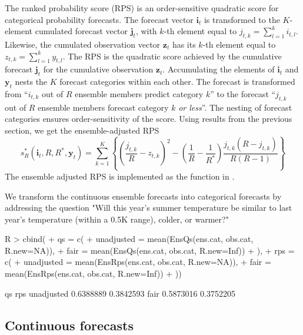 \documentclass[article]{jss}
\begin{document}
The ranked probability score (RPS) is an order-sensitive quadratic score for categorical probability forecasts.
The forecast vector $\mathbf{i}_t$ is transformed to the $K$-element cumulated forecast vector $\mathbf{j}_t$, with $k$-th element equal to $j_{t,k} = \sum_{l=1}^k i_{t,l}$.
Likewise, the cumulated observation vector $\mathbf{z}_t$ has its $k$-th element equal to $z_{t,k} = \sum_{l=1}^k y_{t,l}$.
The RPS is the quadratic score achieved by the cumulative forecast $\mathbf{j}_t$ for the cumulative observation $\mathbf{z}_t$.
Accumulating the elements of $\mathbf{i}_t$ and $\mathbf{y}_t$ nests the $K$ forecast categories within each other. 
The forecast is transformed from ``$i_{t,k}$ out of $R$ ensemble members predict category $k$'' to the forecast ``$j_{t,k}$ out of $R$ ensemble members forecast category $k$ \emph{or less}''.
The nesting of forecast categories ensures order-sensitivity of the score.
Using results from the previous section, we get the ensemble-adjusted RPS
%
\begin{equation}
s_{R}^*(\mathbf{i}_t, R, R^*, \mathbf{y}_t) = \sum_{k=1}^K \left\{ \left(\frac{j_{t,k}}{R} - z_{t,k}\right)^2 - \left(\frac{1}{R} - \frac{1}{R^*}\right) \frac{j_{t,k}(R-j_{t,k})}{R(R-1)}\right\}
\end{equation}
%
The ensemble adjusted RPS is implemented as the function  in .



We transform the continuous ensemble forecasts into categorical forecasts by addressing the question "Will this year's summer temperature be similar to last year's temperature (within a 0.5K range), colder, or warmer?"

\begin{Schunk}
\begin{Sinput}
R > cbind(
+ qs = c(
+   unadjusted = mean(EnsQs(ens.cat, obs.cat, R.new=NA)), 
+   fair       = mean(EnsQs(ens.cat, obs.cat, R.new=Inf))
+ ),
+ rps = c(
+   unadjusted = mean(EnsRps(ens.cat, obs.cat, R.new=NA)), 
+   fair       = mean(EnsRps(ens.cat, obs.cat, R.new=Inf))
+ ))
\end{Sinput}
\begin{Soutput}
                  qs       rps
unadjusted 0.6388889 0.3842593
fair       0.5873016 0.3752205
\end{Soutput}
\end{Schunk}




\subsection{Continuous forecasts}
\end{document}
